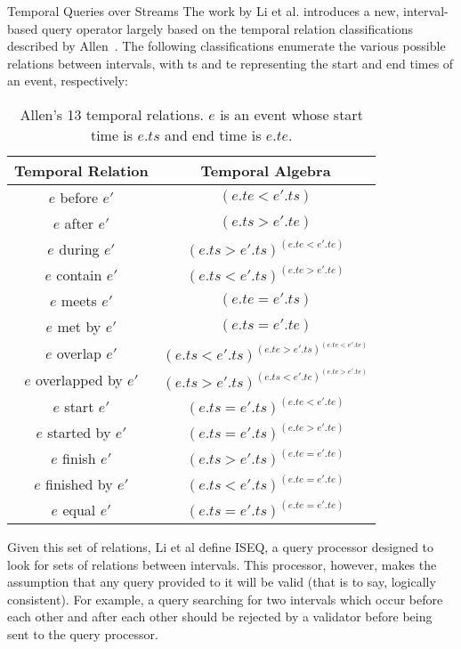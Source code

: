 \documentclass{acm_proc_article-sp}
\begin{document}
Temporal Queries over Streams
The work by Li et al. introduces a new, interval-based query operator largely based on the temporal relation classifications described by Allen~\cite{Allen:1983}.  The following classifications enumerate the various possible relations between intervals, with ts and te representing the start and end times of an event, respectively:

\begin{table}[!ht]\centering
\begin{tabular}{|c|c|}\hline
\textbf{Temporal Relation} & \textbf{Temporal Algebra}\\\hline
$e$ before $e'$ & $(e.te < e'.ts)$\\\hline
$e$ after $e'$ & $(e.ts > e'.te)$\\\hline
$e$ during $e'$ & $(e.ts > e'.ts) ^ (e.te < e'.te)$ \\\hline
$e$ contain $e'$ & $(e.ts < e'.ts) ^ (e.te > e'.te)$ \\\hline
$e$ meets $e'$ & $(e.te = e'.ts)$ \\\hline
$e$ met by $e'$ & $(e.ts = e'.te)$ \\\hline
$e$ overlap $e'$ & $(e.ts < e'.ts) ^ (e.te > e'.ts) ^ (e.te < e'.te)$ \\\hline
$e$ overlapped by $e'$ & $(e.ts > e'.ts) ^ (e.ts < e'.te) ^ (e.te > e'.te)$ \\\hline
$e$ start $e'$ & $(e.ts = e'.ts) ^ (e.te < e'.te)$ \\\hline
$e$ started by $e'$ & $(e.ts = e'.ts) ^ (e.te > e'.te)$ \\\hline
$e$ finish $e'$ & $(e.ts > e'.ts) ^ (e.te = e'.te)$ \\\hline
$e$ finished by $e'$ & $(e.ts < e'.ts) ^ (e.te = e'.te)$ \\\hline
$e$ equal $e'$ & $(e.ts = e'.ts) ^ (e.te = e'.te)$ \\\hline
\end{tabular}
\caption{Allen's 13 temporal relations. $e$ is an event whose start time is $e.ts$ and end time is $e.te$.}\label{tab:relations}
\end{table}

Given this set of relations, Li et al define ISEQ, a query processor designed to look for sets of relations between intervals. This processor, however, makes the assumption that any query provided to it will be valid (that is to say, logically consistent).  For example, a query searching for two intervals which occur before each other and after each other should be rejected by a validator before being sent to the query processor.
\end{document}
